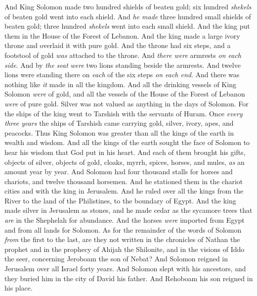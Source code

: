 \begin{biblechapter}
\verse And King Solomon made two hundred shields of beaten gold; six hundred \textit{shekels} of beaten gold went into each shield.
\verse And \textit{he made} three hundred small shields of beaten gold; three hundred \textit{shekels} went into each small shield. And the king put them in the House of the Forest of Lebanon.
\verse And the king made a large ivory throne and overlaid it with pure gold.
\verse And the throne had six steps, and a footstool of gold \textit{was} attached to the throne. And \textit{there were} armrests \textit{on each side}. And by \textit{the seat} \textit{were} two lions standing beside the armrests.
\verse And twelve lions were standing there on \textit{each} of the six steps \textit{on each end}. And there was nothing like \textit{it} made in all the kingdom.
\verse And all the drinking vessels of King Solomon \textit{were} of gold, and all the vessels of the House of the Forest of Lebanon \textit{were} of pure gold. Silver was not valued as anything in the days of Solomon.
\verse For the ships of the king went to Tarshish with the servants of Huram. Once \textit{every three years} the ships of Tarshish came carrying gold, silver, ivory, apes, and peacocks.
\verse Thus King Solomon was greater than all the kings of the earth in wealth and wisdom.
\verse And all the kings of the earth sought the face of Solomon to hear his wisdom that God put in his heart.
\verse And each of them brought his gifts, objects of silver, objects of gold, cloaks, myrrh, spices, horses, and mules, \textit{as} an amount year by year.
\verse And Solomon had four thousand stalls for horses and chariots, and twelve thousand horsemen. And he stationed them in the chariot cities and with the king in Jerusalem.
\verse And he ruled over all the kings from the River to the land of the Philistines, to the boundary of Egypt.
\verse And the king made silver in Jerusalem as stones, and he made cedar as the sycamore trees that \textit{are} in the Shephelah for abundance.
\verse And the horses \textit{were} imported from Egypt and from all lands for Solomon.
 As for the remainder of the words of Solomon \textit{from} the first to the last, are they not written in the chronicles of Nathan the prophet and in the prophecy of Ahijah the Shilonite, and in the visions of Iddo the seer, concerning Jeroboam the son of Nebat?
\verse And Solomon reigned in Jerusalem over all Israel forty years.
\verse And Solomon slept with his ancestors, and they buried him in the city of David his father. And Rehoboam his son reigned in his place.
\end{biblechapter}

